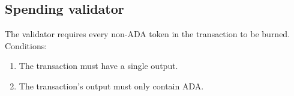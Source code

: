 \documentclass[../midgard.tex]{subfiles}
\begin{document}
\subsection{Spending validator}
\label{h:hub-oracle-spending-validator}

The  validator requires every non-ADA token in the transaction to be burned.
Conditions:
\begin{enumerate}
    \item The transaction must have a single output.
    \item The transaction's output must only contain ADA.
\end{enumerate}
\end{document}

